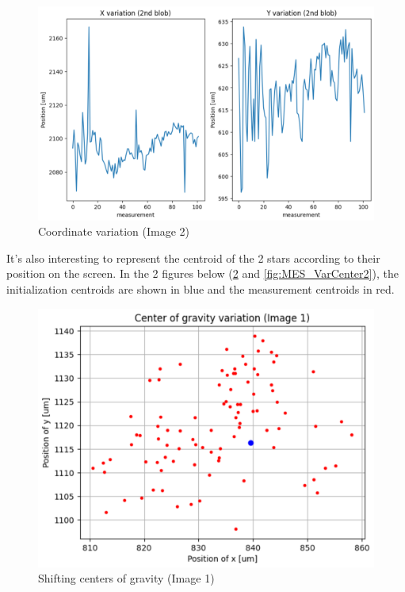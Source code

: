 \begin{figure}[H]
    \centering
    \includegraphics[scale=0.6]{assets/figures/MesuresResultats/VariationImage2.png}
    \caption{Coordinate variation (Image 2)}
    \label{fig:MES_VarIm2}
\end{figure}
\newpage
It's also interesting to represent the centroid of the 2 stars according to their position on the screen. 
In the 2 figures below (\ref{fig:MES_VarCenter1} and \ref{fig:MES_VarCenter2}), the initialization centroids are 
shown in blue and the measurement centroids in red.
\begin{figure}[H]
    \centering
    \includegraphics[scale=0.65]{assets/figures/MesuresResultats/VariationCenter1.png}
    \caption{Shifting centers of gravity (Image 1)}
    \label{fig:MES_VarCenter1}
\end{figure}

